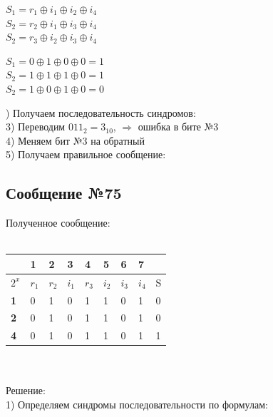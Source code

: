 \documentclass[12pt]{article}
\begin{document}
\begin{multicols}{2}

    \centering

    $S_1 = r_1 \oplus i_1 \oplus i_2 \oplus i_4$\\
    $S_2 = r_2 \oplus i_1 \oplus i_3 \oplus i_4$\\
    $S_2 = r_3 \oplus i_2 \oplus i_3 \oplus i_4$\\

    \columnbreak

    $S_1 = 0 \oplus 1 \oplus 0 \oplus 0 = 1$\\
    $S_2 = 1 \oplus 1 \oplus 1 \oplus 0 = 1$\\
    $S_2 = 1 \oplus 0 \oplus 1 \oplus 0 = 0$\\

\end{multicols}

) Получаем последовательность синдромов: \\
3) Переводим $011_2 = 3_{10}$, $\Rightarrow$ ошибка в бите №3\\
4) Меняем бит №3 на обратный\\
5) Получаем правильное сообщение: 

\subsection{Сообщение №75}

Полученное сообщение: \\
\\
\begin{tabular}{
|p{1cm}|p{1cm}|p{1cm}|p{1cm}|p{1cm}|p{1cm}|p{1cm}|p{1cm}|p{1cm}|}
    \hline
     & 1 & 2 & 3 & 4 & 5 & 6 & 7 & \\
    \hline
    $2^x$ & $r_1$ & $r_2$ & $i_1$ & $r_3$ & $i_2$ & $i_3$ & $i_4$ & S\\
    \hline
    \textbf{1} & \cellcolor{cobalt} 0 & 1 & \cellcolor{cobalt} 0 & 1 & \cellcolor{cobalt} 1 & 0 & \cellcolor{cobalt} 1 & 0\\
    \hline
    \textbf{2} & 0 & \cellcolor{tacao} 1 & \cellcolor{tacao} 0 & 1 & 1 & \cellcolor{tacao} 0 & \cellcolor{tacao} 1 & 0\\
    \hline
    \textbf{4} & 0 & 1 & 0 & \cellcolor{feijoa} 1 & \cellcolor{feijoa} 1 & \cellcolor{feijoa} 0 & \cellcolor{feijoa} 1 & 1\\
    \hline
\end{tabular}
\\
\\
Решение:\\
1) Определяем синдромы последовательности по формулам:
\end{document}
